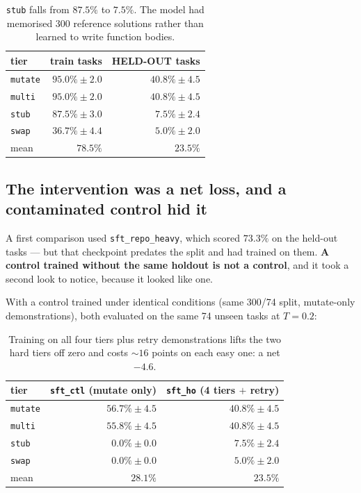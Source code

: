 \documentclass[10pt,a4paper]{article}
\newcommand{\code}[1]{\texttt{\small #1}}
\begin{document}
\begin{table}[h]
\centering\small
\begin{tabular}{@{}lrr@{}}
\toprule
\textbf{tier} & \textbf{train tasks} & \textbf{HELD-OUT tasks} \\
\midrule
\code{mutate} & $95.0\% \pm 2.0$ & $40.8\% \pm 4.5$ \\
\code{multi}  & $95.0\% \pm 2.0$ & $40.8\% \pm 4.5$ \\
\code{stub}   & $87.5\% \pm 3.0$ & $7.5\% \pm 2.4$ \\
\code{swap}   & $36.7\% \pm 4.4$ & $5.0\% \pm 2.0$ \\
\midrule
mean & $78.5\%$ & $\mathbf{23.5\%}$ \\
\bottomrule
\end{tabular}
\caption{\code{stub} falls from $87.5\%$ to $7.5\%$. The model had memorised
300 reference solutions rather than learned to write function bodies.}
\end{table}

\subsection{The intervention was a net loss, and a contaminated control hid it}

A first comparison used \code{sft\_repo\_heavy}, which scored $73.3\%$ on the
held-out tasks --- but that checkpoint predates the split and had trained on
them. \textbf{A control trained without the same holdout is not a control}, and
it took a second look to notice, because it looked like one.

With a control trained under identical conditions (same 300/74 split,
mutate-only demonstrations), both evaluated on the same 74 unseen tasks at
$T{=}0.2$:

\begin{table}[h]
\centering\small
\begin{tabular}{@{}lrr@{}}
\toprule
\textbf{tier} & \textbf{\code{sft\_ctl}} (mutate only) & \textbf{\code{sft\_ho}} (4 tiers $+$ retry) \\
\midrule
\code{mutate} & $\mathbf{56.7\% \pm 4.5}$ & $40.8\% \pm 4.5$ \\
\code{multi}  & $\mathbf{55.8\% \pm 4.5}$ & $40.8\% \pm 4.5$ \\
\code{stub}   & $0.0\% \pm 0.0$ & $\mathbf{7.5\% \pm 2.4}$ \\
\code{swap}   & $0.0\% \pm 0.0$ & $\mathbf{5.0\% \pm 2.0}$ \\
\midrule
mean & $\mathbf{28.1\%}$ & $23.5\%$ \\
\bottomrule
\end{tabular}
\caption{Training on all four tiers plus retry demonstrations lifts the two
hard tiers off zero and costs ${\sim}16$ points on each easy one: a net
$-4.6$.}
\end{table}
\end{document}
